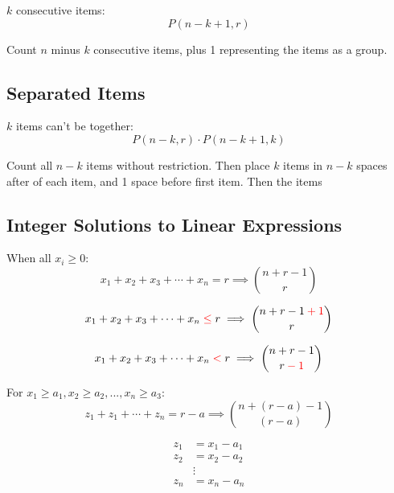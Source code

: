 \documentclass{article}
\begin{document}
    $k$ consecutive items: \begin{equation}
        P(n - k + 1, r)
    \end{equation}

    Count $n$ minus $k$ consecutive items, plus 1 representing the items as a group.

    \subsection{Separated Items}

    $k$ items can't be together: \begin{equation}
        P(n - k, r) \cdot P(n - k + 1, k)
    \end{equation}

    Count all $n - k$ items without restriction. Then place $k$ items in $n - k$ spaces after of each item, and 1 space before first item. Then the items

    \subsection{Integer Solutions to Linear Expressions}

    When all $x_i \geq 0$: \begin{equation}
        x_1 + x_2 + x_3 + \cdots + x_n = r \implies {n + r - 1 \choose r}
    \end{equation}
    
    \begin{equation}
        x_1 + x_2 + x_3 + \cdots + x_n \color{red}\leq\color{black} r \implies {n + r - 1 \color{red}+ 1\color{black} \choose r}
    \end{equation}
    
    \begin{equation}
        x_1 + x_2 + x_3 + \cdots + x_n \color{red}<\color{black} r \implies {n + r - 1 \choose r \color{red}- 1\color{black}}
    \end{equation}

    For $x_1 \geq a_1, x_2 \geq a_2, ..., x_n \geq a_3$: \begin{equation}
        z_1 + z_1 + \cdots + z_n = r - a \implies {n + (r - a) - 1 \choose (r - a)}
    \end{equation}

    \begin{align*}
        z_1 &= x_1 - a_1 \\
        z_2 &= x_2 - a_2 \\
        &\vdots \\
        z_n &= x_n - a_n \\
    \end{align*}
\end{document}

